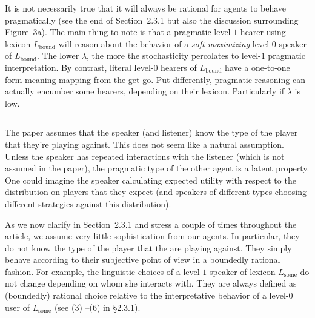 \documentclass[12pt,a4paper]{article}
\begin{document}
It is not necessarily true that it will always be rational for agents to behave pragmatically (see the end of Section~2.3.1 but also the discussion surrounding Figure~3a).  The main thing to note is that a pragmatic level-$1$ hearer using lexicon $L_{\text{bound}}$ will reason about the behavior of a {\em soft-maximizing} level-$0$ speaker of $L_{\text{bound}}$. The lower $\lambda$, the more the stochasticity percolates to level-$1$ pragmatic interpretation. By contrast, literal level-$0$ hearers of $L_{\text{bound}}$ have a one-to-one form-meaning mapping from the get go. Put differently, pragmatic reasoning can actually encumber some hearers, depending on their lexicon. Particularly if $\lambda$ is low.


%
\vspace{0.5cm}

\noindent\rule{\textwidth}{1pt}

\begin{mdframed}[backgroundcolor=gray!25,linecolor=gray!25,frametitle= Reviewer \thereviewerCounter~comment \thereviewerCommentCounter \hfill ~~({\it agent simplicity})]
%
The paper assumes that the speaker (and listener) know the type of the player that they're playing against. This does not seem like a natural assumption. Unless the speaker has repeated interactions with the listener (which is not assumed in the paper), the pragmatic type of the other agent is a latent property. One could imagine the speaker calculating expected utility with respect to the distribution on players that they expect (and speakers of different types choosing different strategies against this distribution). 

%
\end{mdframed}

As we now clarify in Section~2.3.1 and stress a couple of times throughout the article, we assume very little sophistication from our agents. In particular, they do not know the type of the player that the are playing against. They simply behave according to their subjective point of view in a boundedly rational fashion. For example, the linguistic choices of a level-$1$ speaker of lexicon $L_{\text{some}}$ do not change depending on whom she interacts with. They are always defined as (boundedly) rational choice relative to the interpretative behavior of a level-$0$ user of $L_{\text{some}}$ (see (3) --(6) in \S2.3.1).
%

\vspace{0.5cm}
\end{document}
